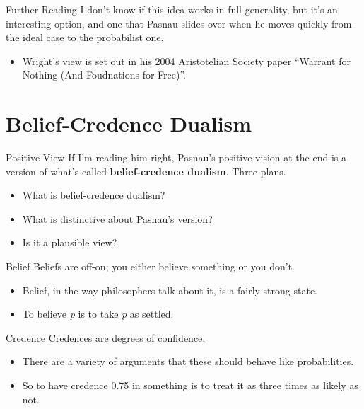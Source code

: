 \documentclass[
  17pt,
  letterpaper,
  ignorenonframetext,
  aspectratio=169,
]{beamer}
\providecommand{\tightlist}{%
  \setlength{\itemsep}{0pt}\setlength{\parskip}{0pt}}\usepackage{longtable,booktabs,array}
\begin{document}
\begin{frame}{Further Reading}
\protect\hypertarget{further-reading}{}
I don't know if this idea works in full generality, but it's an
interesting option, and one that Pasnau slides over when he moves
quickly from the ideal case to the probabilist one.

\begin{itemize}[<+->]
\tightlist
\item
  Wright's view is set out in his 2004 Aristotelian Society paper
  ``Warrant for Nothing (And Foudnations for Free)''.
\end{itemize}
\end{frame}

\hypertarget{belief-credence-dualism}{%
\section{Belief-Credence Dualism}\label{belief-credence-dualism}}

\begin{frame}{Positive View}
\protect\hypertarget{positive-view}{}
If I'm reading him right, Pasnau's positive vision at the end is a
version of what's called \textbf{belief-credence dualism}. Three plans.

\begin{itemize}[<+->]
\tightlist
\item
  What is belief-credence dualism?
\item
  What is distinctive about Pasnau's version?
\item
  Is it a plausible view?
\end{itemize}
\end{frame}

\begin{frame}{Belief}
\protect\hypertarget{belief}{}
Beliefs are off-on; you either believe something or you don't.

\begin{itemize}[<+->]
\tightlist
\item
  Belief, in the way philosophers talk about it, is a fairly strong
  state.
\item
  To believe \emph{p} is to take \emph{p} as settled.
\end{itemize}
\end{frame}

\begin{frame}{Credence}
\protect\hypertarget{credence}{}
Credences are degrees of confidence.

\begin{itemize}[<+->]
\tightlist
\item
  There are a variety of arguments that these should behave like
  probabilities.
\item
  So to have credence 0.75 in something is to treat it as three times as
  likely as not.
\end{itemize}
\end{frame}
\end{document}

